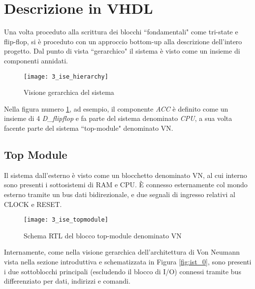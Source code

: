 \section{Descrizione in VHDL}
Una volta proceduto alla scrittura dei blocchi \textquotedblleft fondamentali" come tri-state e flip-flop, si è proceduto con un approccio bottom-up alla descrizione dell'intero progetto. Dal punto di vista \textquotedblleft gerarchico" il sistema è visto come un insieme di componenti annidati.
\begin{figure}[H]
	\centering
	\texttt{[image: 3\_ise\_hierarchy]}
	\caption{Visione gerarchica del sistema}
	\label{fig:ise_hierarchy}
\end{figure}
\noindent
Nella figura numero \ref{fig:ise_hierarchy}, ad esempio, il componente \textit{ACC} è definito come un insieme di 4 \textit{D\_flipflop} e fa parte del sistema denominato \textit{CPU}, a sua volta facente parte del sistema \textquotedblleft top-module" denominato VN.

\subsection{Top Module}
Il sistema dall'esterno è visto come un blocchetto denominato VN, al cui interno sono presenti i sottosistemi di RAM e CPU. È connesso esternamente col mondo esterno tramite un bus dati bidirezionale, e due segnali di ingresso relativi al CLOCK e RESET.
\begin{figure}[H]
	\centering
	\texttt{[image: 3\_ise\_topmodule]}
	\caption{Schema RTL del blocco top-module denominato VN}
	\label{fig:ise_topmodule}
\end{figure}
\noindent
Internamente, come nella visione gerarchica dell'architettura di Von Neumann vista nella sezione introduttiva e schematizzata in Figura \ref{fig:ist_0}, sono presenti i due sottoblocchi principali (escludendo il blocco di I/O) connessi tramite bus differenziato per dati, indirizzi e comandi.

